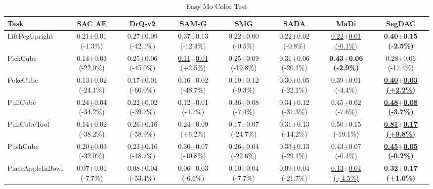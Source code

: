 \begin{table}[htbp]
\centering
\scriptsize
\caption{Easy Mo Color Test}
\label{tab:appendix_mocolortest_easy}
\begin{adjustbox}{max width=\textwidth}
\begin{tabular}{l*{7}{c}}
\toprule
\textbf{Task} & \textbf{SAC AE} & \textbf{DrQ-v2} & \textbf{SAM-G} & \textbf{SMG} & \textbf{SADA} & \textbf{MaDi} & \textbf{SegDAC} \\
\midrule
LiftPegUpright & 0.21$\pm$0.01 \scriptsize{(-1.3\%)} & 0.27$\pm$0.09 \scriptsize{(-42.1\%)} & 0.37$\pm$0.13 \scriptsize{(-12.4\%)} & 0.22$\pm$0.00 \scriptsize{(-0.5\%)} & 0.22$\pm$0.02 \scriptsize{(-0.8\%)} & \underline{0.22$\pm$0.01 \scriptsize{(-0.1\%)}} & \textbf{0.40$\pm$0.15 \scriptsize{(-2.5\%)}} \\
PickCube & 0.14$\pm$0.03 \scriptsize{(-22.0\%)} & 0.25$\pm$0.06 \scriptsize{(-45.0\%)} & \underline{0.11$\pm$0.01 \scriptsize{(+2.5\%)}} & 0.25$\pm$0.09 \scriptsize{(-19.8\%)} & 0.31$\pm$0.06 \scriptsize{(-20.1\%)} & \textbf{0.43$\pm$0.06 \scriptsize{(-2.9\%)}} & 0.28$\pm$0.06 \scriptsize{(-17.4\%)} \\
PokeCube & 0.13$\pm$0.02 \scriptsize{(-24.1\%)} & 0.17$\pm$0.01 \scriptsize{(-60.0\%)} & 0.16$\pm$0.02 \scriptsize{(-48.7\%)} & 0.19$\pm$0.12 \scriptsize{(-9.3\%)} & 0.30$\pm$0.05 \scriptsize{(-22.1\%)} & 0.39$\pm$0.01 \scriptsize{(-4.4\%)} & \textbf{\underline{0.40$\pm$0.03 \scriptsize{(+2.2\%)}}} \\
PullCube & 0.24$\pm$0.04 \scriptsize{(-34.2\%)} & 0.22$\pm$0.02 \scriptsize{(-39.7\%)} & 0.12$\pm$0.01 \scriptsize{(-4.7\%)} & 0.36$\pm$0.08 \scriptsize{(-7.4\%)} & 0.34$\pm$0.12 \scriptsize{(-31.3\%)} & 0.45$\pm$0.02 \scriptsize{(-7.6\%)} & \textbf{\underline{0.48$\pm$0.08 \scriptsize{(-3.7\%)}}} \\
PullCubeTool & 0.14$\pm$0.02 \scriptsize{(-38.2\%)} & 0.26$\pm$0.16 \scriptsize{(-58.9\%)} & 0.24$\pm$0.09 \scriptsize{(+6.2\%)} & 0.17$\pm$0.07 \scriptsize{(-24.7\%)} & 0.31$\pm$0.13 \scriptsize{(-14.2\%)} & 0.50$\pm$0.15 \scriptsize{(-19.1\%)} & \textbf{\underline{0.81$\pm$0.17 \scriptsize{(+9.8\%)}}} \\
PushCube & 0.20$\pm$0.03 \scriptsize{(-32.0\%)} & 0.23$\pm$0.16 \scriptsize{(-48.7\%)} & 0.30$\pm$0.07 \scriptsize{(-40.8\%)} & 0.26$\pm$0.04 \scriptsize{(-22.6\%)} & 0.33$\pm$0.13 \scriptsize{(-29.1\%)} & 0.43$\pm$0.07 \scriptsize{(-6.4\%)} & \textbf{\underline{0.45$\pm$0.05 \scriptsize{(-0.2\%)}}} \\
PlaceAppleInBowl & 0.07$\pm$0.01 \scriptsize{(-7.7\%)} & 0.08$\pm$0.04 \scriptsize{(-53.4\%)} & 0.06$\pm$0.03 \scriptsize{(-6.6\%)} & 0.10$\pm$0.04 \scriptsize{(-7.7\%)} & 0.09$\pm$0.04 \scriptsize{(-21.7\%)} & \underline{0.13$\pm$0.04 \scriptsize{(+4.5\%)}} & \textbf{0.32$\pm$0.17 \scriptsize{(+1.0\%)}} \\

\end{tabular}
\end{adjustbox}
\end{table}
